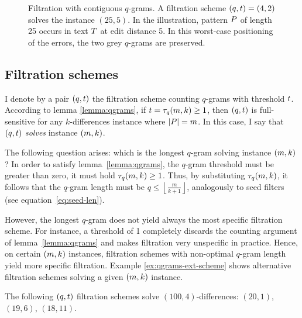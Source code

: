 \begin{figure}[h]
\begin{center}
\caption[Filtration with contiguous $q$-grams]{Filtration with contiguous $q$-grams. A filtration scheme $(q,t) = (4,2)$ solves the instance $(25,5)$. In the illustration, pattern $P$ of length 25 occurs in text $T$ at edit distance 5. In this worst-case positioning of the errors, the two grey $q$-grams are preserved.}
\label{fig:qgrams-ext}

\end{center}
\end{figure}

\subsection{Filtration schemes}
\label{sec:filtering:qgrams-ext:schemes}

I denote by a pair $(q,t)$ the filtration scheme counting $q$-grams with threshold $t$.
According to lemma \ref{lemma:qgrams}, if $t = \tau_q(m,k) \geq 1$, then $(q,t)$ is full-sensitive for any $k$-differences instance where $|P|=m$.
In this case, I say that $(q,t)$ \emph{solves} instance $(m,k)$.

The following question arises: which is the longest $q$-gram solving instance $(m,k)$?
In order to satisfy lemma~\ref{lemma:qgrams}, the $q$-gram threshold must be greater than zero, \ie it must hold $\tau_q(m,k) \geq 1$.
Thus, by substituting $\tau_q(m,k)$, it follows that the $q$-gram length must be $q \leq \left \lfloor \frac{m}{k+1} \right \rfloor$, analogously to seed filters (see equation~\ref{eq:seed-len}).

However, the longest $q$-gram does not yield always the most specific filtration scheme.
For instance, a threshold of 1 completely discards the counting argument of lemma~\ref{lemma:qgrams} and makes filtration very unspecific in practice.
Hence, on certain $(m,k)$ instances, filtration schemes with non-optimal $q$-gram length yield more specific filtration.
Example \ref{ex:qgrams-ext-scheme} shows alternative filtration schemes solving a given $(m,k)$ instance.

\begin{example}
\label{ex:qgrams-ext-scheme}
The following $(q,t)$ filtration schemes solve $(100,4)$-differences:
$(20,1)$, $(19,6)$, $(18,11)$.
\end{example}


